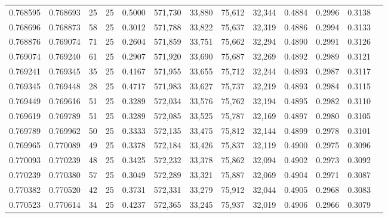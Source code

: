 \begin{tabular}{rrrrrrrrrrrrr}
0.768595 & 0.768693 &    25 &  25 &                                     0.5000 & 571,730 &  33,880 &  75,612 &  32,344 & 0.4884 & 0.2996 & 0.3138 \\
0.768696 & 0.768873 &    58 &  25 &                                     0.3012 & 571,788 &  33,822 &  75,637 &  32,319 & 0.4886 & 0.2994 & 0.3133 \\
0.768876 & 0.769074 &    71 &  25 &                                     0.2604 & 571,859 &  33,751 &  75,662 &  32,294 & 0.4890 & 0.2991 & 0.3126 \\
0.769074 & 0.769240 &    61 &  25 &                                     0.2907 & 571,920 &  33,690 &  75,687 &  32,269 & 0.4892 & 0.2989 & 0.3121 \\
0.769241 & 0.769345 &    35 &  25 &                                     0.4167 & 571,955 &  33,655 &  75,712 &  32,244 & 0.4893 & 0.2987 & 0.3117 \\
0.769345 & 0.769448 &    28 &  25 &                                     0.4717 & 571,983 &  33,627 &  75,737 &  32,219 & 0.4893 & 0.2984 & 0.3115 \\
0.769449 & 0.769616 &    51 &  25 &                                     0.3289 & 572,034 &  33,576 &  75,762 &  32,194 & 0.4895 & 0.2982 & 0.3110 \\
0.769619 & 0.769789 &    51 &  25 &                                     0.3289 & 572,085 &  33,525 &  75,787 &  32,169 & 0.4897 & 0.2980 & 0.3105 \\
0.769789 & 0.769962 &    50 &  25 &                                     0.3333 & 572,135 &  33,475 &  75,812 &  32,144 & 0.4899 & 0.2978 & 0.3101 \\
0.769965 & 0.770089 &    49 &  25 &                                     0.3378 & 572,184 &  33,426 &  75,837 &  32,119 & 0.4900 & 0.2975 & 0.3096 \\
0.770093 & 0.770239 &    48 &  25 &                                     0.3425 & 572,232 &  33,378 &  75,862 &  32,094 & 0.4902 & 0.2973 & 0.3092 \\
0.770239 & 0.770380 &    57 &  25 &                                     0.3049 & 572,289 &  33,321 &  75,887 &  32,069 & 0.4904 & 0.2971 & 0.3087 \\
0.770382 & 0.770520 &    42 &  25 &                                     0.3731 & 572,331 &  33,279 &  75,912 &  32,044 & 0.4905 & 0.2968 & 0.3083 \\
0.770523 & 0.770614 &    34 &  25 &                                     0.4237 & 572,365 &  33,245 &  75,937 &  32,019 & 0.4906 & 0.2966 & 0.3079 \\

\end{tabular}
